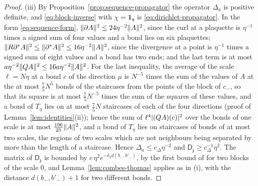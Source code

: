 \documentclass[11pt]{preprint}
\DeclarePairedDelimiter{\abs}{\lvert}{\rvert}
\DeclarePairedDelimiter{\norm}{\lVert}{\rVert}
\numberwithin{equation}{section}
\theoremstyle{definition}
\theoremstyle{remark}
\theoremstyle{plain}
\begin{document}
\begin{proof}
(iii) By Proposition~\ref{prop:sequence-propagator} the operator $\Delta_a$ is positive definite, and \eqref{eq:block-inverse} with $\chi = \mathbf 1_{\mathfrak y}$ is \eqref{eq:dirichlet-propagator}. In the form \eqref{eq:sequence-form}, $\norm{\partial A}^2 \leq 24\eta^{-2}\norm A^2$, since the curl at a plaquette is $\eta^{-1}$ times a signed sum of four values and a bond lies on six plaquettes; $\norm{R\partial^*A}^2 \leq \norm{\partial^*A}^2 \leq 16\eta^{-2}\norm A^2$, since the divergence at a point is $\eta^{-1}$ times a signed sum of eight values and a bond has two ends; and the last term is at most $a\eta^{-2}\norm{QA}^2 \leq 16a\eta^{-2}\norm A^2$. For the last inequality, the average of the scale $\ell = N\eta$ at a bond $c$ of the direction $\mu$ is $N^{-5}$ times the sum of the values of $A$ at the at most $\frac75N^5$ bonds of the staircases from the points of the block of $c_-$, so that its square is at most $\frac75N^{-5}$ times the sum of the squares of these values, and a bond of $T_\eta$ lies on at most $\frac75N$ staircases of each of the four directions (proof of Lemma~\ref{lem:identities}(ii)); hence the sum of $\ell^4\abs{(QA)(c)}^2$ over the bonds of one scale is at most $\frac{196}{25}\norm A^2$, and a bond of $T_\eta$ lies on staircases of bonds of at most two scales, the regions of two scales which are not neighbours being separated by more than the length of a staircase. Hence $\Delta_a \leq c_\Delta\eta^{-2}$ and $\mathsf D_{\mathfrak z} \geq c_\Delta^{-1}\eta^2$. The matrix of $\mathsf D_{\mathfrak z}$ is bounded by $c\,\eta^2e^{-\delta_3d(b_-, b'_-)}$, by the first bound of \cite[(2.136)]{BalabanPRT2} for two blocks of the scale $0$, and Lemma~\ref{lem:combes-thomas} applies as in (i), with the distance $d(b_-, b'_-) + 1$ for two different bonds.


\end{proof}
\end{document}
